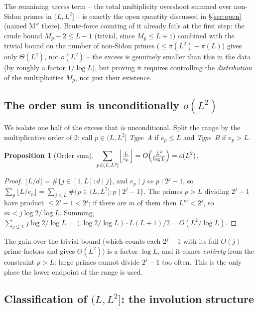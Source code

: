 \documentclass[11pt]{article}
\theoremstyle{plain}
\newtheorem{proposition}[theorem]{Proposition}
\theoremstyle{definition}
\theoremstyle{remark}
\newcommand{\ep}{e_p}
\begin{document}
The remaining \emph{excess} term -- the total multiplicity overshoot summed
over non-Sidon primes in $(L,L^2]$ -- is exactly the open quantity discussed
in \S\ref{sec:open} (named M$''$ there). Brute-force counting of it already
fails at the first step: the crude bound $M_p-2\le L-1$ (trivial, since
$M_p\le L+1$) combined with the trivial bound on the number of non-Sidon
primes ($\le\pi(L^2)-\pi(L)$) gives only $\Theta(L^2)$, not $o(L^2)$ -- the
excess is genuinely smaller than this in the data (by roughly a factor
$1/\log L$), but proving it requires controlling the \emph{distribution} of
the multiplicities $M_p$, not just their existence.

\subsection{The order sum is unconditionally $o(L^2)$}\label{sec:ordersum}

We isolate one half of the excess that \emph{is} unconditional. Split the range
by the multiplicative order of $2$: call $p\in(L,L^2]$ \emph{Type~A} if $\ep\le L$
and \emph{Type~B} if $\ep>L$.

\begin{proposition}[Order sum]\label{prop:ordersum}
$\displaystyle\sum_{p\in(L,L^2]}\Bigl\lfloor\tfrac{L}{\ep}\Bigr\rfloor
=O\!\left(\tfrac{L^2}{\log L}\right)=o(L^2)$.
\end{proposition}
\begin{proof}
$\lfloor L/d\rfloor=\#\{j\in[1,L]:d\mid j\}$, and $\ep\mid j\iff p\mid2^j-1$, so
$\sum_{p}\lfloor L/\ep\rfloor=\sum_{j\le L}\#\{p\in(L,L^2]:p\mid2^j-1\}$. The
primes $p>L$ dividing $2^j-1$ have product $\le2^j-1<2^j$; if there are $m$ of
them then $L^m<2^j$, so $m<j\log2/\log L$. Summing,
$\sum_{j\le L}j\log2/\log L=(\log2/\log L)\cdot L(L+1)/2=O(L^2/\log L)$.
\end{proof}

The gain over the trivial bound (which counts each $2^j-1$ with its full $O(j)$
prime factors and gives $\Theta(L^2)$) is a factor $\log L$, and it comes
\emph{entirely} from the constraint $p>L$: large primes cannot divide $2^j-1$
too often. This is the only place the lower endpoint of the range is used.

\subsection{Classification of $(L,L^2]$: the involution structure}\label{sec:classify}
\end{document}
